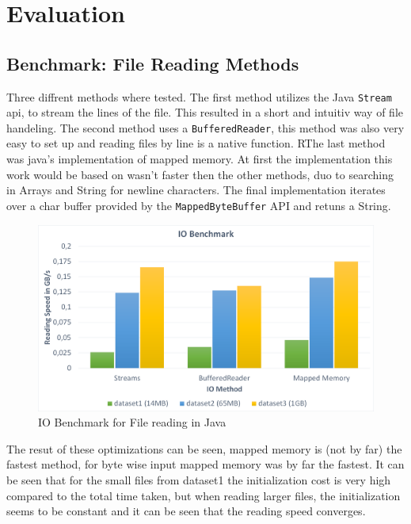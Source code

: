 \chapter{Evaluation}
\label{Evaluation}


\section{Benchmark: File Reading Methods}
\label{FileReading}
Three diffrent methods where tested.  The first method utilizes the Java \texttt{Stream} api, to stream the lines of the file. This resulted in a short and intuitiv way of file handeling. The second method uses a \texttt{BufferedReader}, this method was also very easy to set up and reading files by line is a native function. RThe last method was java's implementation of mapped memory. At first the implementation this work would be based on wasn't faster then the other methods, duo to searching in Arrays and String for newline characters. The final implementation iterates over a char buffer provided by the \texttt{MappedByteBuffer} API and retuns a String.
\begin{figure}[H]
\centering
  \includegraphics[width=1.0\linewidth]{img/iobench.png}
 \caption{IO Benchmark for File reading in Java}
  \label{iobench}
\end{figure}
The resut of these optimizations can be seen, mapped memory is (not by far) the fastest method, for byte wise input mapped memory was by far the fastest. It can be seen that for the small files from dataset1 the initialization cost is very high compared to the total time taken, but when reading larger files, the initialization seems to be constant and it can be seen that the reading speed converges.